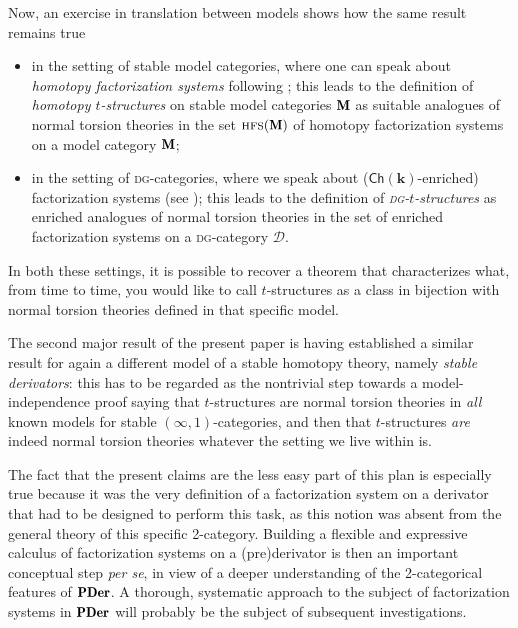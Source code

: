 Now, an exercise in translation between models shows how the same result remains true
\begin{itemize}
\item in the setting of stable model categories, where one can speak about \emph{homotopy factorization systems} following \cite{bousfield1977constructions,Joy}; this leads to the definition of  \emph{homotopy $t$\hyp{}structures} on stable model categories $\cate{M}$ as suitable analogues of normal torsion theories in the set $\textsc{hfs}(\cate{M})$ of homotopy factorization systems on a model category $\cate{M}$;
\item in the setting of \textsc{dg}\hyp{}categories, where we speak about ($\textsf{Ch}(\mathbf{k})$-enriched) factorization systems (see \cite{Day1974,enrichFS}); this leads to the definition of \emph{\textsc{dg}\hyp{}$t$\hyp{}structures} as enriched analogues of normal torsion theories in the set of enriched factorization systems on a \textsc{dg}\hyp{}category $\mathcal D$.
\end{itemize}
In both these settings, it is possible to recover a theorem that characterizes what, from time to time, you would like to call $t$-structures as a class in bijection with normal torsion theories defined in that specific model.

The second major result of the present paper is having established a similar result for again a different model of a stable homotopy theory, namely \emph{stable derivators}: this has to be regarded as the nontrivial step towards a model\hyp{}independence proof saying that $t$-structures are normal torsion theories in \emph{all} known models for stable $(\infty,1)$-categories, and then that $t$-structures \emph{are} indeed normal torsion theories whatever the setting we live within is. 

The fact that the present claims are the less easy part of this plan is especially true because  it was the very definition of a factorization system on a derivator that had to be designed to perform this task, as this notion was absent from the general theory of this specific 2\hyp{}category. Building a flexible and expressive calculus of factorization systems on a (pre)derivator is then an important conceptual step \emph{per se}, in view of a deeper understanding of the 2\hyp{}categorical features of $\PDer$.
  A thorough, systematic approach to the subject of factorization systems in $\PDer$ will probably be the subject of subsequent investigations.
  
